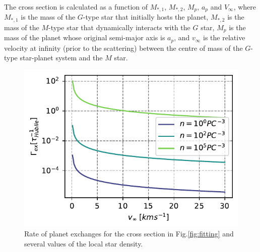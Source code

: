 \documentclass[twocolumn]{aastex62}
\begin{document}
The cross section is calculated as a function of $M_{*,1}$, $M_{*,2}$, $M_p$, $a_p$ and $V_\infty$, where $M_{*,1}$ is the mass of the $G$-type star that initially hosts the planet, $M_{*,2}$ is the mass of the $M$-type star that dynamically interacts with the $G$ star, $M_p$ is the mass of the planet whose original semi-major axis is $a_p$, and $v_\infty$ is the relative velocity at infinity (prior to the scattering) between the centre of mass of the $G$-type star-planet system and the $M$ star.

\begin{figure}
 \includegraphics[width=0.9\columnwidth]{letter-rate}
  \caption{Rate of planet exchanges for the cross section in Fig.\ref{fig:fitting} and several values of the local star density.}
 \label{fig:rate}
\end{figure}
\end{document}
